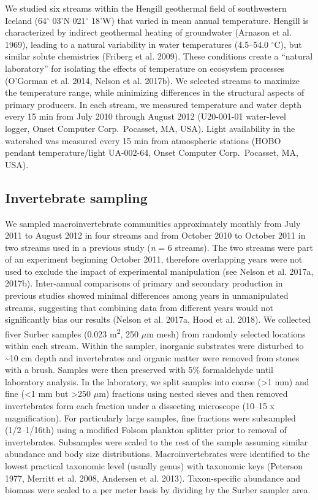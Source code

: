 \documentclass[
]{article}
\begin{document}
We studied six streams within the Hengill geothermal field of
southwestern Iceland (64\(^\circ\) 03'N 021\(^\circ\) 18'W) that varied
in mean annual temperature. Hengill is characterized by indirect
geothermal heating of groundwater (Arnason et al. 1969), leading to a
natural variability in water temperatures (4.5--54.0 \(^\circ\)C), but
similar solute chemistries (Friberg et al. 2009). These conditions
create a ``natural laboratory'' for isolating the effects of temperature
on ecosystem processes (O'Gorman et al. 2014, Nelson et al. 2017b). We
selected streams to maximize the temperature range, while minimizing
differences in the structural aspects of primary producers. In each
stream, we measured temperature and water depth every 15 min from July
2010 through August 2012 (U20-001-01 water-level logger, Onset Computer
Corp.~Pocasset, MA, USA). Light availability in the watershed was
measured every 15 min from atmospheric stations (HOBO pendant
temperature/light UA-002-64, Onset Computer Corp.~Pocasset, MA, USA).

\hypertarget{invertebrate-sampling}{%
\subsection{Invertebrate sampling}\label{invertebrate-sampling}}

We sampled macroinvertebrate communities approximately monthly from July
2011 to August 2012 in four streams and from October 2010 to October
2011 in two streams used in a previous study (\emph{n} = 6 streams). The
two streams were part of an experiment beginning October 2011, therefore
overlapping years were not used to exclude the impact of experimental
manipulation (see Nelson et al. 2017a, 2017b). Inter-annual comparisons
of primary and secondary production in previous studies showed minimal
differences among years in unmanipulated streams, suggesting that
combining data from different years would not significantly bias our
results (Nelson et al. 2017a, Hood et al. 2018). We collected fiver
Surber samples (0.023 m\textsuperscript{2}, 250 \(\mu\)m mesh) from
randomly selected locations within each stream. Within the sampler,
inorganic substrates were disturbed to \textasciitilde10 cm depth and
invertebrates and organic matter were removed from stones with a brush.
Samples were then preserved with 5\% formaldehyde until laboratory
analysis. In the laboratory, we split samples into coarse (\textgreater1
mm) and fine (\textless1 mm but \textgreater250 \(\mu\)m) fractions
using nested sieves and then removed invertebrates form each fraction
under a dissecting microscope (10--15 x magnification). For particularly
large samples, fine fractions were subsampled (1/2--1/16th) using a
modified Folsom plankton splitter prior to removal of invertebrates.
Subsamples were scaled to the rest of the sample assuming similar
abundance and body size distributions. Macroinvertebrates were
identified to the lowest practical taxonomic level (usually genus) with
taxonomic keys (Peterson 1977, Merritt et al. 2008, Andersen et al.
2013). Taxon-specific abundance and biomass were scaled to a per meter
basis by dividing by the Surber sampler area.
\end{document}
